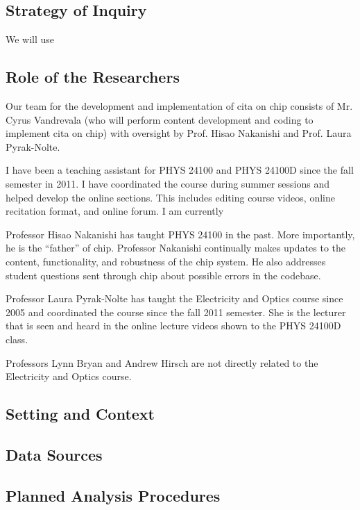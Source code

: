 \subsection{Strategy of Inquiry}

We will use

\subsection{Role of the Researchers}

Our team for the development and implementation of \gls{cita} on \gls{chip} consists of Mr. Cyrus Vandrevala (who will perform content development and coding to implement \gls{cita} on \gls{chip}) with oversight by Prof. Hisao Nakanishi and Prof. Laura Pyrak-Nolte.

I have been a teaching assistant for PHYS 24100 and PHYS 24100D since the fall semester in 2011. I have coordinated the course during summer sessions and helped develop the online sections. This includes editing course videos, online recitation format, and online forum. I am currently

Professor Hisao Nakanishi has taught PHYS 24100 in the past. More importantly, he is the ``father'' of \gls{chip}. Professor Nakanishi continually makes updates to the content, functionality, and robustness of the \gls{chip} system. He also addresses student questions sent through \gls{chip} about possible errors in the codebase.

Professor Laura Pyrak-Nolte has taught the Electricity and Optics course since 2005 and coordinated the course since the fall 2011 semester. She is the lecturer that is seen and heard in the online lecture videos shown to the PHYS 24100D class.

Professors Lynn Bryan and Andrew Hirsch are not directly related to the Electricity and Optics course.

\subsection{Setting and Context}
\subsection{Data Sources}

\subsection{Planned Analysis Procedures}

